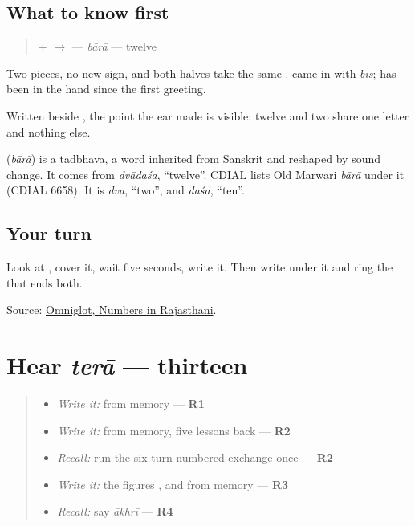 \subsection*{What to know first}
\begin{quote}
\textbf{} + \textbf{} $\to$ \textbf{} — \emph{bārā} — twelve
\end{quote}

Two pieces, no new sign, and both halves take the same \textbf{}. \textbf{} came in with \emph{bīs}; \textbf{} has been in the hand since the first greeting.

Written beside \textbf{}, the point the ear made is visible: twelve and two share one letter and nothing else.

\begin{cousinweb}
\textbf{} (\emph{bārā}) is a tadbhava, a word inherited from Sanskrit and reshaped by sound change. It comes from \emph{dvādaśa}, \textquotedblleft{}twelve\textquotedblright{}. CDIAL lists Old Marwari \emph{bārā} under it (CDIAL 6658). It is \emph{dva}, \textquotedblleft{}two\textquotedblright{}, and \emph{daśa}, \textquotedblleft{}ten\textquotedblright{}.
\end{cousinweb}

\subsection*{Your turn}
Look at \textbf{}, cover it, wait five seconds, write it. Then write \textbf{} under it and ring the \textbf{} that ends both.

\begin{tcolorbox}[breakable,colback=teal!4,colframe=teal!35!black,title={Before you move on}]
Source: \href{https://www.omniglot.com/language/numbers/rajasthani.htm}{Omniglot, Numbers in Rajasthani}.
\end{tcolorbox}
\section[terā]{Hear \emph{terā} — thirteen}

\label{lesson:MW-C37-hear-tera}



\begin{quote}
\begin{itemize}
\raggedright
  \item \emph{Write it:} \textbf{} from memory — \textbf{R1}
  \item \emph{Write it:} \textbf{} from memory, five lessons back — \textbf{R2}
  \item \emph{Recall:} run the six-turn numbered exchange once — \textbf{R2}
  \item \emph{Write it:} the figures \textbf{}, \textbf{} and \textbf{} from memory — \textbf{R3}
  \item \emph{Recall:} say \emph{ākhrī} — \textbf{R4}
\end{itemize}
\end{quote}

